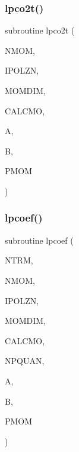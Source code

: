 \mbox{\label{_m_i_e_v0_8f_af491bde683b4a07ee245f9c3e53c6894}} 
\subsubsection{\texorpdfstring{lpco2t()}{lpco2t()}}
{\footnotesize\ttfamily subroutine lpco2t (\begin{DoxyParamCaption}\item[{integer}]{N\+M\+OM,  }\item[{integer}]{I\+P\+O\+L\+ZN,  }\item[{integer}]{M\+O\+M\+D\+IM,  }\item[{logical, dimension( $\ast$ )}]{C\+A\+L\+C\+MO,  }\item[{complex, dimension( $\ast$ )}]{A,  }\item[{complex, dimension( $\ast$ )}]{B,  }\item[{real, dimension( 0\+:momdim, $\ast$ )}]{P\+M\+OM }\end{DoxyParamCaption})}

\mbox{\label{_m_i_e_v0_8f_a8f1c192fc6a73a6b9e55d5a52de1f201}} 
\subsubsection{\texorpdfstring{lpcoef()}{lpcoef()}}
{\footnotesize\ttfamily subroutine lpcoef (\begin{DoxyParamCaption}\item[{integer}]{N\+T\+RM,  }\item[{integer}]{N\+M\+OM,  }\item[{integer}]{I\+P\+O\+L\+ZN,  }\item[{integer}]{M\+O\+M\+D\+IM,  }\item[{logical, dimension( $\ast$ )}]{C\+A\+L\+C\+MO,  }\item[{integer}]{N\+P\+Q\+U\+AN,  }\item[{complex, dimension( $\ast$ )}]{A,  }\item[{complex, dimension( $\ast$ )}]{B,  }\item[{real, dimension( 0\+:momdim, $\ast$ )}]{P\+M\+OM }\end{DoxyParamCaption})}


